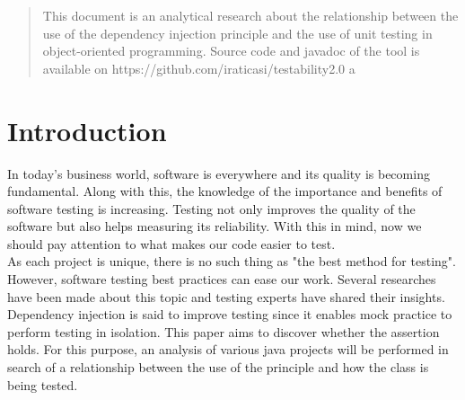 \documentclass[11pt, a4paper, twocolumn]{article}
\begin{document}
\begin{abstract}
This document is an analytical research about the relationship between the use of the dependency injection principle and the use of unit testing in object-oriented programming. Source code and javadoc of the tool is available on https://github.com/iraticasi/testability2.0 a
\end{abstract}


\section{Introduction}
In today’s business world, software is everywhere and its quality is becoming fundamental. Along with this, the knowledge of the importance and benefits of software testing is increasing. Testing not only improves the quality of the software but also helps measuring its reliability. With this in mind, now we should pay attention to what makes our code easier to test.\\
As each project is unique, there is no such thing as "the best method for testing". However, software testing best practices can ease our work. Several researches have been made about this topic and testing experts have shared their insights.\\
Dependency injection is said to improve testing since it enables mock practice to perform testing in isolation. This paper aims to discover whether the assertion holds. For this purpose, an analysis of various java projects will be performed in search of a relationship between the use of the principle and how the class is being tested.


\end{document}
